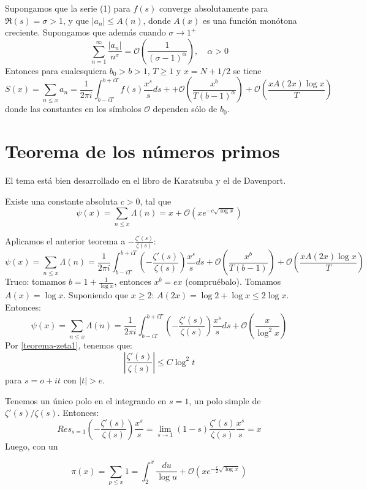 \documentclass[TAN.tex]{subfiles}
\begin{document}
\begin{teorema}
Supongamos que la serie (1) para $f(s)$ converge absolutamente para $\Re(s) = σ > 1$, y que $|a_n| ≤ A(n)$, donde $A(x)$ es una función monótona creciente. Supongamos que además cuando $σ \to 1^+$
\[ \sum_{n=1}^{∞} \frac{|a_n|}{n^σ} = \mathcal{O}\left(\frac{1}{(σ-1)^α}\right), \quad α > 0\]
Entonces para cualesquiera $b_0>b>1$, $T≥1$ y $x=N+1/2$ se tiene
\[ S(x) = \sum_{n≤x} a_n = \frac{1}{2πi} \int_{b-iT}^{b+iT} f(s) \frac{x^s}{s} ds ++ \mathcal{O}\left(\frac{x^b}{T(b-1)^α}\right) + \mathcal{O}\left(\frac{xA(2x)\log x}{T}\right)\]
donde las constantes en los símbolos $\mathcal{O}$ dependen sólo de $b_0$.
\end{teorema}

\section{Teorema de los números primos}
El tema está bien desarrollado en el libro de Karatsuba y el de Davenport.

\begin{teorema}
Existe una constante absoluta $c > 0$, tal que
\[ ψ(x) = \sum_{n≤x} Λ(n) = x + \mathcal{O}\left(xe^{-c\sqrt{\log x}}\right) \]
\end{teorema}
\begin{dem}
Aplicamos el anterior teorema a $-\frac{ζ'(s)}{ζ(s)}$:
\[ ψ(x) = \sum_{n≤x} Λ(n) = \frac{1}{2πi} \int_{b-iT}^{b+iT}\left(-\frac{ζ'(s)}{ζ(s)}\right)\frac{x^s}{s} ds + \mathcal{O}\left(\frac{x^b}{T(b-1)}\right) + \mathcal{O}\left(\frac{xA(2x)\log x}{T}\right) \]
Truco: tomamos $b = 1+\frac{1}{\log x}$, entonces $x^b = ex$ (compruébalo). Tomamos $A(x)=\log x$. Suponiendo que $x ≥ 2$: $A(2x)=\log 2 + \log x ≤ 2\log x$. Entonces:
\[ ψ(x) = \sum_{n≤x} Λ(n) = \frac{1}{2πi} \int_{b-iT}^{b+iT}\left(-\frac{ζ'(s)}{ζ(s)}\right)\frac{x^s}{s} ds + \mathcal{O}\left(\frac{x}{\log^2x}\right) \]
Por \ref{teorema-zeta1}, tenemos que:
\[ \left|\frac{ζ'(s)}{ζ(s)}\right| ≤ C \log^2 t\]
para $s=ο+it$ con $|t|>e$.

Tenemos un único polo en el integrando en $s=1$, un polo simple de $ζ'(s)/ζ(s)$. Entonces:
\[ Res_{s=1} \left(-\frac{ζ'(s)}{ζ(s)}\right)\frac{x^s}{s} = \lim_{s\to1} (1-s)\frac{ζ'(s)}{ζ(s)} \frac{x^s}{s} = x\]
Luego, con un 
\end{dem}

\begin{teorema}
\[ π(x) = \sum_{p≤x} 1 = \int_2^x \frac{du}{\log u} + \mathcal{O}\left(xe^{-\frac{c}{2} \sqrt{\log x}}\right) \]
\end{teorema}
\end{document}
